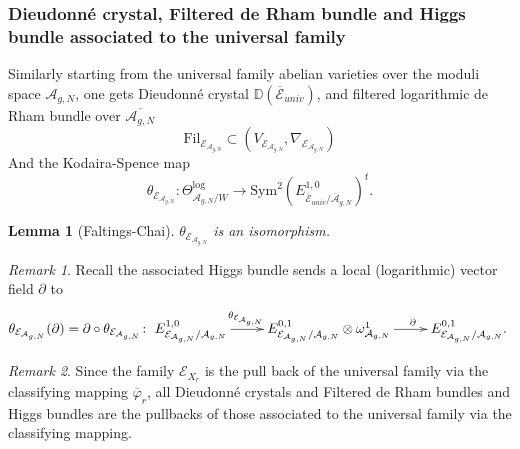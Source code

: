 \documentclass[12pt,twoside]{book}
\theoremstyle{plain}
\newtheorem{lemma}[lemma]{Lemma}
\theoremstyle{definition}
\theoremstyle{remark}
\newtheorem{remark}[remark]{Remark}
\numberwithin{equation}{section}
\begin{document}
\subsubsection{Dieudonn\'e crystal, Filtered de Rham bundle and Higgs bundle associated to the universal family}
Similarly starting from the universal family abelian varieties over the moduli space $\mathcal A_{g,N}$, one gets Dieudonn\'e crystal $\mathbb D(\overline{\mathcal E}_{univ})$, and filtered logarithmic de Rham bundle over $\overline{\mathcal A_{g,N}}$
\[\mathrm{Fil}_{\mathcal E_{\mathcal A_{g,N}}} \subset (V_{\mathcal E_{\mathcal A_{g,N}}},\nabla_{\mathcal E_{\mathcal A_{g,N}}})\]
And the Kodaira-Spence map
\begin{equation}
\label{theta:universal}
\theta_{\mathcal E_{{\mathcal A_{g,N}}}}\colon
\Theta^{\log}_{{\mathcal A_{g,N}}/W} \longrightarrow \mathrm{Sym}^2 \left( E^{1,0}_{\overline{\mathcal E}_{univ}/{\overline{\mathcal A}_{g,N}}}\right)^t.
\end{equation}

\begin{lemma} [Faltings-Chai]
$\theta_{\mathcal E_{{\mathcal A_{g,N}}}}$ is an isomorphism.
\end{lemma}
\begin{remark}
Recall the associated Higgs bundle sends a local (logarithmic) vector field $\partial$ to
\begin{equation*}
\theta_{\mathcal E_{{\mathcal A_{g,N}}}}(\partial) = \partial \circ \theta_{\mathcal E_{{\mathcal A_{g,N}}}}\colon
\xymatrix{E^{1,0}_{\mathcal E_{{\mathcal A_{g,N}}}/{\mathcal A_{g,N}}} \ar[r]^(0.4){\theta_{\mathcal E_{{\mathcal A_{g,N}}}}} & E^{0,1}_{\mathcal E_{{\mathcal A_{g,N}}}/{\mathcal A_{g,N}}} \otimes \omega^1_{{\mathcal A_{g,N}}} \ar[r]^(0.6)\partial & E^{0,1}_{\mathcal E_{{\mathcal A_{g,N}}}/{\mathcal A_{g,N}}}.}
\end{equation*}
\end{remark}

\begin{remark}
Since the family $\mathcal E_{X_r}$ is the pull back of the universal family via the classifying mapping $\overline{\varphi}_r$, all Dieudonn\'e crystals and Filtered de Rham bundles and Higgs bundles are the pullbacks of those associated to the universal family via the classifying mapping.
\end{remark}
\end{document}
